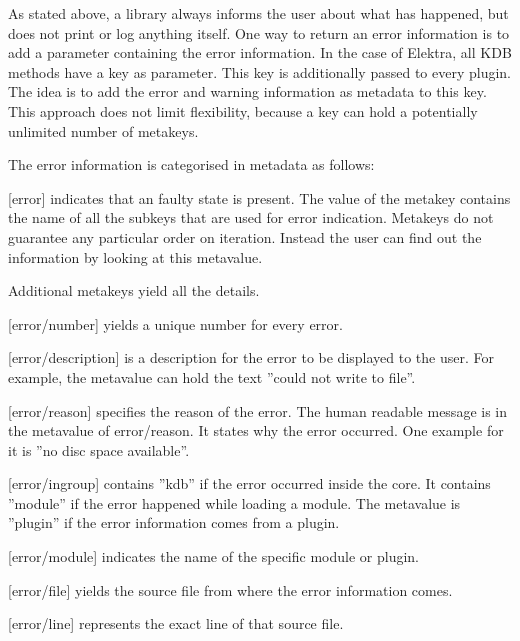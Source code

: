 As stated above, a library always informs the user about what has happened, but does not print or log anything itself. One way to return an error information is to add a parameter containing the error information. In the case of Elektra, all {\ttfamily K\+D\+B} methods have a key as parameter. This key is additionally passed to every plugin. The idea is to add the error and warning information as metadata to this key. This approach does not limit flexibility, because a key can hold a potentially unlimited number of metakeys.

The error information is categorised in metadata as follows\+:


\begin{DoxyItemize}
\item \mbox{[}error\mbox{]} indicates that an faulty state is present. The value of the metakey contains the name of all the subkeys that are used for error indication. Metakeys do not guarantee any particular order on iteration. Instead the user can find out the information by looking at this metavalue.
\end{DoxyItemize}

Additional metakeys yield all the details.


\begin{DoxyItemize}
\item \mbox{[}error/number\mbox{]} yields a unique number for every error.
\item \mbox{[}error/description\mbox{]} is a description for the error to be displayed to the user. For example, the metavalue can hold the text ''could not write to file''.
\item \mbox{[}error/reason\mbox{]} specifies the reason of the error. The human readable message is in the metavalue of {\ttfamily error/reason}. It states why the error occurred. One example for it is ''no disc space available''.
\item \mbox{[}error/ingroup\mbox{]} contains ''{\ttfamily kdb}'' if the error occurred inside the core. It contains ''{\ttfamily module}'' if the error happened while loading a module. The metavalue is ''{\ttfamily plugin}'' if the error information comes from a plugin.
\item \mbox{[}error/module\mbox{]} indicates the name of the specific module or plugin.
\item \mbox{[}error/file\mbox{]} yields the source file from where the error information comes.
\item \mbox{[}error/line\mbox{]} represents the exact line of that source file.
\end{DoxyItemize}

